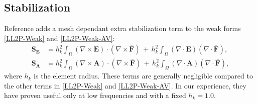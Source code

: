 \subsection{Stabilization}

Reference \cite{L2P-BE} adds a mesh dependant extra stabilization term to the weak forms \ref{LL2P-Weak} and \ref{LL2P-Weak-AV}: 
\begin{equation}
	\begin{aligned}
		\mathbf{S}_{\mathbf{E}} &= h^{2}_{k}\int_{\Omega}\left(\nabla\times\mathbf{E}\right)\cdot\left(\nabla\times\mathbf{\bar{F}}\right)\, + \,h^{2}_{k}\int_{\Omega}\left(\nabla\cdot\mathbf{E}\right) \left(\nabla\cdot\mathbf{\bar{F}}\right),
		\\
		\mathbf{S}_{\mathbf{A}} &= h^{2}_{k}\int_{\Omega}\left(\nabla\times\mathbf{A}\right)\cdot\left(\nabla\times\mathbf{\bar{F}}\right)\, + \,h^{2}_{k}\int_{\Omega}\left(\nabla\cdot\mathbf{A}\right)\left(\nabla\cdot\mathbf{\bar{F}}\right),
	\end{aligned}
\end{equation}
where $h_{k}$ is the element radius. These terms are generally negligible compared to the other terms in \ref{LL2P-Weak} and \ref{LL2P-Weak-AV}. In our experience, they have proven useful only at low frequencies and with a fixed $h_{k} = 1.0$. 








